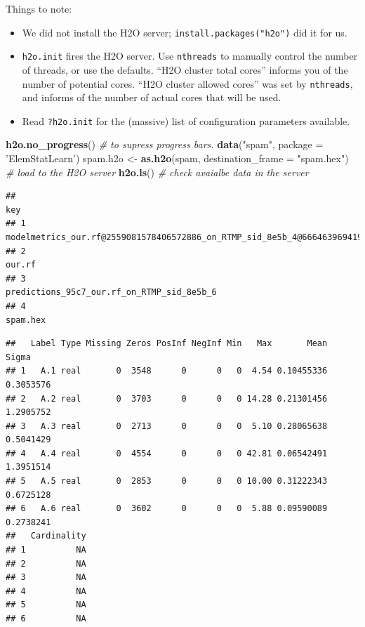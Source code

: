 \documentclass[]{book}
\newenvironment{Shaded}{\begin{snugshade}}{\end{snugshade}}
\newcommand{\CommentTok}[1]{\textcolor[rgb]{0.56,0.35,0.01}{\textit{#1}}}
\newcommand{\DataTypeTok}[1]{\textcolor[rgb]{0.13,0.29,0.53}{#1}}
\newcommand{\KeywordTok}[1]{\textcolor[rgb]{0.13,0.29,0.53}{\textbf{#1}}}
\newcommand{\NormalTok}[1]{#1}
\newcommand{\OperatorTok}[1]{\textcolor[rgb]{0.81,0.36,0.00}{\textbf{#1}}}
\newcommand{\StringTok}[1]{\textcolor[rgb]{0.31,0.60,0.02}{#1}}
\providecommand{\tightlist}{%
  \setlength{\itemsep}{0pt}\setlength{\parskip}{0pt}}
\theoremstyle{definition}
\theoremstyle{definition}
\theoremstyle{definition}
\theoremstyle{remark}
\begin{document}
Things to note:

\begin{itemize}
\tightlist
\item
  We did not install the H2O server; \texttt{install.packages("h2o")} did it for us.
\item
  \texttt{h2o.init} fires the H2O server. Use \texttt{nthreads} to manually control the number of threads, or use the defaults. ``H2O cluster total cores'' informs you of the number of potential cores. ``H2O cluster allowed cores'' was set by \texttt{nthreads}, and informs of the number of actual cores that will be used.
\item
  Read \texttt{?h2o.init} for the (massive) list of configuration parameters available.
\end{itemize}

\begin{Shaded}
\begin{Highlighting}[]
\KeywordTok{h2o.no_progress}\NormalTok{() }\CommentTok{# to supress progress bars. }
\KeywordTok{data}\NormalTok{(}\StringTok{"spam"}\NormalTok{, }\DataTypeTok{package =} \StringTok{'ElemStatLearn'}\NormalTok{)}
\NormalTok{spam.h2o <-}\StringTok{ }\KeywordTok{as.h2o}\NormalTok{(spam, }\DataTypeTok{destination_frame =} \StringTok{"spam.hex"}\NormalTok{) }\CommentTok{# load to the H2O server}
\KeywordTok{h2o.ls}\NormalTok{() }\CommentTok{# check avaialbe data in the server}
\end{Highlighting}
\end{Shaded}

\begin{verbatim}
##                                                                             key
## 1 modelmetrics_our.rf@2559081578406572886_on_RTMP_sid_8e5b_4@666463969419818392
## 2                                                                        our.rf
## 3                                    predictions_95c7_our.rf_on_RTMP_sid_8e5b_6
## 4                                                                      spam.hex
\end{verbatim}

\begin{Shaded}
\end{Shaded}

\begin{verbatim}
##   Label Type Missing Zeros PosInf NegInf Min   Max       Mean     Sigma
## 1   A.1 real       0  3548      0      0   0  4.54 0.10455336 0.3053576
## 2   A.2 real       0  3703      0      0   0 14.28 0.21301456 1.2905752
## 3   A.3 real       0  2713      0      0   0  5.10 0.28065638 0.5041429
## 4   A.4 real       0  4554      0      0   0 42.81 0.06542491 1.3951514
## 5   A.5 real       0  2853      0      0   0 10.00 0.31222343 0.6725128
## 6   A.6 real       0  3602      0      0   0  5.88 0.09590089 0.2738241
##   Cardinality
## 1          NA
## 2          NA
## 3          NA
## 4          NA
## 5          NA
## 6          NA
\end{verbatim}
\end{document}
